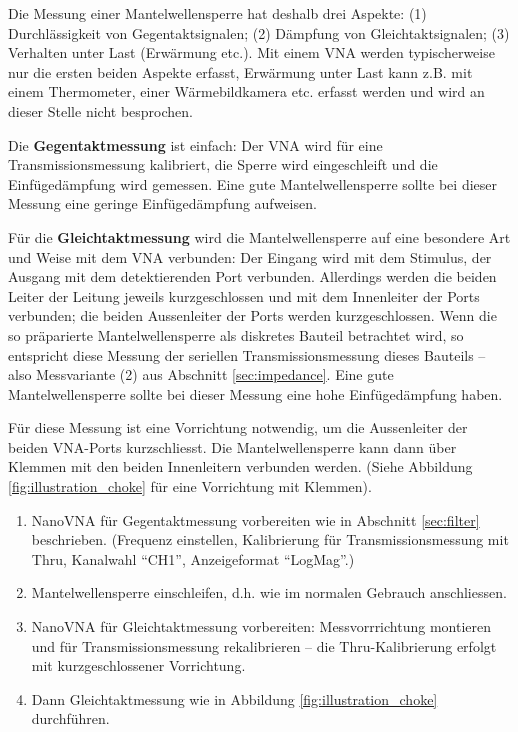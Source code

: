 \documentclass[twoside,a4paper,11pt,halfparskip,DIV=11,notitlepage]{scrartcl}
\begin{document}
Die Messung einer Mantelwellensperre hat deshalb drei Aspekte:
(1) Durchlässigkeit von Gegentaktsignalen;
(2) Dämpfung von Gleichtaktsignalen;
(3) Verhalten unter Last (Erwärmung etc.).
Mit einem VNA werden typischerweise nur die ersten beiden Aspekte erfasst,
Erwärmung unter Last kann z.B. mit einem Thermometer, einer Wärmebildkamera
etc. erfasst werden und wird an dieser Stelle nicht besprochen.

Die \textbf{Gegentaktmessung} ist einfach: Der VNA wird für eine Transmissionsmessung
kalibriert, die Sperre wird eingeschleift und die Einfügedämpfung wird
gemessen. Eine gute Mantelwellensperre sollte bei dieser Messung eine geringe
Einfügedämpfung aufweisen.

Für die \textbf{Gleichtaktmessung} wird die Mantelwellensperre auf eine besondere
Art und Weise mit dem VNA verbunden: Der Eingang wird mit dem Stimulus,
der Ausgang mit dem detektierenden Port verbunden. Allerdings werden die
beiden Leiter der Leitung jeweils kurzgeschlossen und mit dem
Innenleiter der Ports verbunden; die beiden Aussenleiter der Ports werden
kurzgeschlossen. Wenn die so präparierte Mantelwellensperre als diskretes
Bauteil betrachtet wird, so entspricht diese Messung der seriellen
Transmissionsmessung dieses Bauteils -- also Messvariante (2) aus
Abschnitt \ref{sec:impedance}. Eine gute Mantelwellensperre
sollte bei dieser Messung eine hohe Einfügedämpfung haben.

Für diese Messung ist eine Vorrichtung notwendig, um die Aussenleiter der
beiden VNA-Ports kurzschliesst. Die Mantelwellensperre kann dann über Klemmen
mit den beiden Innenleitern verbunden werden. (Siehe Abbildung
\ref{fig:illustration_choke} für eine Vorrichtung mit Klemmen).

\begin{enumerate}
    \item NanoVNA für Gegentaktmessung vorbereiten wie in Abschnitt \ref{sec:filter} beschrieben.
        (Frequenz einstellen, Kalibrierung für Transmissionsmessung mit Thru, Kanalwahl ``CH1'',
        Anzeigeformat ``LogMag''.)
    \item Mantelwellensperre einschleifen, d.h. wie im normalen Gebrauch anschliessen.
    \item NanoVNA für Gleichtaktmessung vorbereiten: Messvorrrichtung montieren und für
        Transmissionsmessung rekalibrieren -- die Thru-Kalibrierung erfolgt mit kurzgeschlossener
        Vorrichtung.
    \item Dann Gleichtaktmessung wie in Abbildung \ref{fig:illustration_choke} durchführen.
\end{enumerate}
\end{document}

